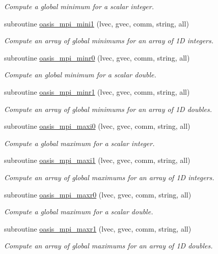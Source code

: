 \begin{DoxyCompactItemize}
\begin{DoxyCompactList}\small\item\em Compute a global minimum for a scalar integer. \end{DoxyCompactList}\item 
subroutine \hyperlink{classmod__oasis__mpi_aed0c20d56fdab764f0ad8e48e3a7209f}{oasis\+\_\+mpi\+\_\+mini1} (lvec, gvec, comm, string, all)
\begin{DoxyCompactList}\small\item\em Compute an array of global minimums for an array of 1\+D integers. \end{DoxyCompactList}\item 
subroutine \hyperlink{classmod__oasis__mpi_af3628ad005b1a21e8f33e3dc2be38635}{oasis\+\_\+mpi\+\_\+minr0} (lvec, gvec, comm, string, all)
\begin{DoxyCompactList}\small\item\em Compute an global minimum for a scalar double. \end{DoxyCompactList}\item 
subroutine \hyperlink{classmod__oasis__mpi_a29c460b836ae9ad77ee1ac21f684d188}{oasis\+\_\+mpi\+\_\+minr1} (lvec, gvec, comm, string, all)
\begin{DoxyCompactList}\small\item\em Compute an array of global minimums for an array of 1\+D doubles. \end{DoxyCompactList}\item 
subroutine \hyperlink{classmod__oasis__mpi_a0b469347d40c78c317042fa069d9baa5}{oasis\+\_\+mpi\+\_\+maxi0} (lvec, gvec, comm, string, all)
\begin{DoxyCompactList}\small\item\em Compute a global maximum for a scalar integer. \end{DoxyCompactList}\item 
subroutine \hyperlink{classmod__oasis__mpi_a2ba8d76b016ddde4013aecc2ca0b1d9f}{oasis\+\_\+mpi\+\_\+maxi1} (lvec, gvec, comm, string, all)
\begin{DoxyCompactList}\small\item\em Compute an array of global maximums for an array of 1\+D integers. \end{DoxyCompactList}\item 
subroutine \hyperlink{classmod__oasis__mpi_a7f46e23956ff948e039c5c1cdde0f6f3}{oasis\+\_\+mpi\+\_\+maxr0} (lvec, gvec, comm, string, all)
\begin{DoxyCompactList}\small\item\em Compute a global maximum for a scalar double. \end{DoxyCompactList}\item 
subroutine \hyperlink{classmod__oasis__mpi_ae57151fc4714e33d7e0e1cf0aa65ae64}{oasis\+\_\+mpi\+\_\+maxr1} (lvec, gvec, comm, string, all)
\begin{DoxyCompactList}\small\item\em Compute an array of global maximums for an array of 1\+D doubles. \end{DoxyCompactList}\end{DoxyCompactItemize}


